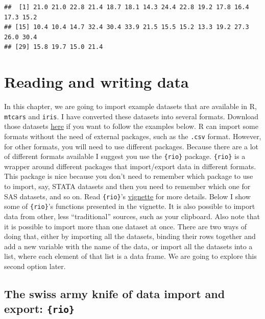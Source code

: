 \documentclass[]{gitbook}
\begin{document}
\begin{verbatim}
##  [1] 21.0 21.0 22.8 21.4 18.7 18.1 14.3 24.4 22.8 19.2 17.8 16.4 17.3 15.2
## [15] 10.4 10.4 14.7 32.4 30.4 33.9 21.5 15.5 15.2 13.3 19.2 27.3 26.0 30.4
## [29] 15.8 19.7 15.0 21.4
\end{verbatim}

\hypertarget{reading-and-writing-data}{%
\section{Reading and writing data}\label{reading-and-writing-data}}

In this chapter, we are going to import example datasets that are available in R, \texttt{mtcars} and
\texttt{iris}. I have converted these datasets into several formats. Download those datasets
\href{https://github.com/b-rodrigues/modern_R/tree/master/datasets}{here} if you want to follow the
examples below. R can import some formats without the need of external packages, such as the \texttt{.csv}
format. However, for other formats, you will need to use different packages. Because there are a
lot of different formats available I suggest you use the \texttt{\{rio\}} package.
\texttt{\{rio\}} is a wrapper around different packages that import/export data in different formats.
This package is nice because you don't need to remember which package to use to import, say,
STATA datasets and then you need to remember which one for SAS datasets, and so on. Read \texttt{\{rio\}}'s
\href{https://cran.r-project.org/web/packages/rio/vignettes/rio.html}{vignette} for more details. Below
I show some of \texttt{\{rio\}}'s functions presented in the vignette. It is also possible to import data from
other, less ``traditional'' sources, such as your clipboard. Also note that it is possible to import
more than one dataset at once. There are two ways of doing that, either by importing all the
datasets, binding their rows together and add a new variable with the name of the data, or import
all the datasets into a list, where each element of that list is a data frame. We are going to
explore this second option later.

\hypertarget{the-swiss-army-knife-of-data-import-and-export-rio}{%
\subsection{\texorpdfstring{The swiss army knife of data import and export: \texttt{\{rio\}}}{The swiss army knife of data import and export: \{rio\}}}\label{the-swiss-army-knife-of-data-import-and-export-rio}}
\end{document}
